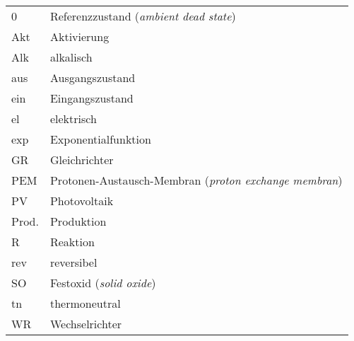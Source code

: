 \begin{onehalfspacing}
\begin{longtable}[h]{p{} p{}}
		0 		& Referenzzustand (\emph{ambient dead state})\\
		Akt		& Aktivierung\\
		Alk		& alkalisch\\
		aus		& Ausgangszustand\\
		ein		& Eingangszustand\\
		el		& elektrisch\\
		exp		& Exponentialfunktion\\
		GR		& Gleichrichter\\
		PEM		& Protonen-Austausch-Membran (\emph{proton exchange membran})\\
		PV		& Photovoltaik\\
		Prod.	& Produktion\\
		R		& Reaktion\\
		rev		& reversibel\\
		SO		& Festoxid (\emph{solid oxide})\\
		tn		& thermoneutral\\
		WR		& Wechselrichter\\

		
\end{longtable}
\end{onehalfspacing}
